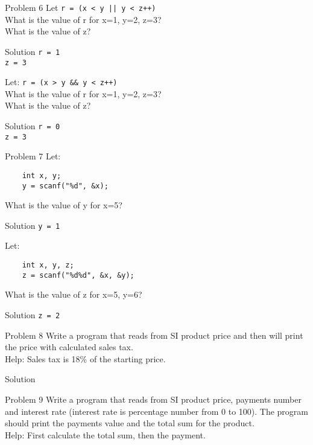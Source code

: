 \begin{frame}[fragile]{Problem 6}
Let \texttt{r = (x < y || y < z++)}\\
	What is the value of r for x=1, y=2, z=3?\\
	What is the value of z?
	\begin{exampleblock}{Solution}
	\texttt{r = 1\\z = 3}
	\end{exampleblock}
Let: \texttt{r = (x > y \&\& y < z++)}\\
	What is the value of r for x=1, y=2, z=3?\\
	What is the value of z?
	\begin{exampleblock}{Solution}
	\texttt{r = 0\\z = 3}
	\end{exampleblock}
\end{frame}

\begin{frame}[fragile]{Problem 7}
Let:
\begin{lstlisting}
	int x, y;
	y = scanf("%d", &x);
\end{lstlisting}
What is the value of y for x=5?
	\begin{exampleblock}{Solution}
	\texttt{y = 1}
	\end{exampleblock}
Let:
\begin{lstlisting}
	int x, y, z;
	z = scanf("%d%d", &x, &y);
\end{lstlisting}
	What is the value of z for x=5, y=6?
	\begin{exampleblock}{Solution}
	\texttt{z = 2}
	\end{exampleblock}
\end{frame}


\begin{frame}[fragile]{Problem 8}
Write a program that reads from SI product price and then will print the
price with calculated sales tax.\\ Help: Sales tax is 18\% of the starting
price.
	\begin{exampleblock}{Solution}
		
	\end{exampleblock}
\end{frame}


\begin{frame}[fragile]{Problem 9}
Write a program that reads from SI product price, payments number and interest
rate (interest rate is percentage number from 0 to 100). The program should
print the payments value and the total sum for the product.\\
Help: First calculate the total sum, then the payment.
\end{frame}

